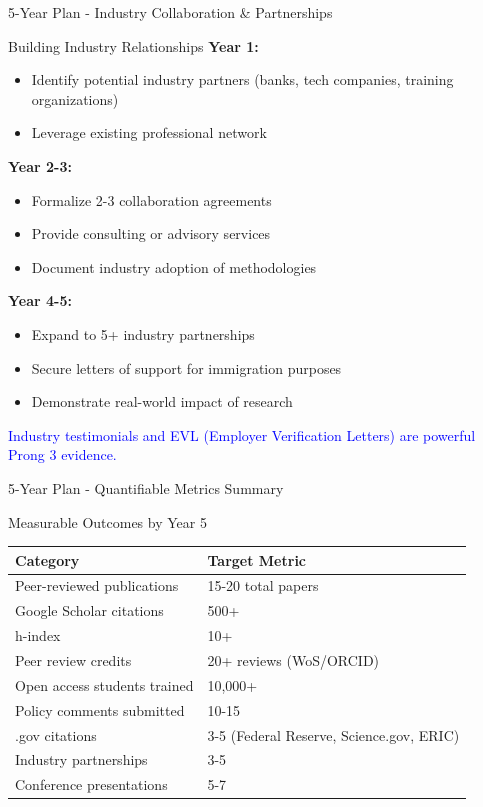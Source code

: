 \documentclass[11pt]{beamer}
\begin{document}
	\begin{frame}{5-Year Plan - Industry Collaboration \& Partnerships}
		\scriptsize
		\begin{block}{Building Industry Relationships}
			\textbf{Year 1:}
			\begin{itemize}
				\item Identify potential industry partners (banks, tech companies, training organizations)
				\item Leverage existing professional network
			\end{itemize}
			\textbf{Year 2-3:}
			\begin{itemize}
				\item Formalize 2-3 collaboration agreements
				\item Provide consulting or advisory services
				\item Document industry adoption of methodologies
			\end{itemize}
			\textbf{Year 4-5:}
			\begin{itemize}
				\item Expand to 5+ industry partnerships
				\item Secure letters of support for immigration purposes
				\item Demonstrate real-world impact of research
			\end{itemize}
			\textcolor{blue}{Industry testimonials and EVL (Employer Verification Letters) are powerful Prong 3 evidence.}
		\end{block}
	\end{frame}
	
	\begin{frame}{5-Year Plan - Quantifiable Metrics Summary}
		\scriptsize
		\begin{block}{Measurable Outcomes by Year 5}
			\centering
			\begin{tabular}{|p{4cm}|p{5cm}|}
				\hline
				\textbf{Category} & \textbf{Target Metric} \\
				\hline
				Peer-reviewed publications & 15-20 total papers \\
				\hline
				Google Scholar citations & 500+ \\
				\hline
				h-index & 10+ \\
				\hline
				Peer review credits & 20+ reviews (WoS/ORCID) \\
				\hline
				Open access students trained & 10,000+ \\
				\hline
				Policy comments submitted & 10-15 \\
				\hline
				.gov citations & 3-5 (Federal Reserve, Science.gov, ERIC) \\
				\hline
				Industry partnerships & 3-5 \\
				\hline
				Conference presentations & 5-7 \\
				\hline
			\end{tabular}
		\end{block}
	\end{frame}
	
\end{document}
